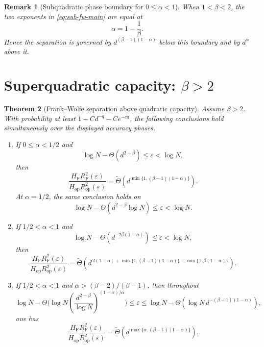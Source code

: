 \documentclass[11pt]{article}
\newtheorem{theorem}{Theorem}[section]
\newtheorem{remark}[theorem]{Remark}
\newcommand{\eps}{\varepsilon}
\newcommand{\RF}{R_{\mathrm F}}
\newcommand{\Rop}{R_{\mathrm{op}}}
\newcommand{\HF}{H_{\mathrm F}}
\newcommand{\Hop}{H_{\mathrm{op}}}
\begin{document}
\begin{remark}[Subquadratic phase boundary for $0\leq\alpha<1$]
When $1<\beta<2$, the two exponents in
\eqref{eq:sub-fw-main} are equal at
\[
 \alpha=1-\frac1\beta.
\]
Hence the separation is governed by
$d^{(\beta-1)(1-\alpha)}$ below this boundary and by $d^\alpha$ above
it.
\end{remark}

\section{Superquadratic capacity: \texorpdfstring{$\beta>2$}{beta>2}}

\begin{theorem}[Frank--Wolfe separation above quadratic capacity]
\label{thm:super-fw}
Assume $\beta>2$.  With probability at least
$1-Cd^{-q}-Ce^{-cd}$, the following conclusions hold simultaneously
over the displayed accuracy phases.

\begin{enumerate}[label=\textup{(\roman*)},leftmargin=2.2em]
\item If $0\leq\alpha<1/2$ and
\[
 \log N-\Theta(d^{2-\beta})\le\eps<\log N,
\]
then
\begin{equation}
 \frac{\HF\RF^2(\eps)}{\Hop\Rop^2(\eps)}
 =
 \widetilde\Theta\!\left(
 d^{\min\{1,(\beta-1)(1-\alpha)\}}
 \right).
 \label{eq:super-fw-diffuse-below}
\end{equation}
At $\alpha=1/2$, the same conclusion holds on
\[
 \log N-\Theta(d^{2-\beta}\log N)\leq\eps<\log N.
\]

\item If $1/2<\alpha<1$ and
\[
 \log N-\Theta(d^{-2\beta(1-\alpha)})\leq\eps<\log N,
\]
then
\begin{equation}
 \frac{\HF\RF^2(\eps)}{\Hop\Rop^2(\eps)}
 =
 \widetilde\Theta\!\left(
 d^{\,2(1-\alpha)
 +\min\{1,(\beta-1)(1-\alpha)\}
 -\min\{1,\beta(1-\alpha)\}}
 \right).
 \label{eq:super-fw-local-between}
\end{equation}

\item If $1/2<\alpha<1$ and
$\alpha>(\beta-2)/(\beta-1)$, then throughout
\begin{equation}
 \log N-\Theta\big(\log N
 \left(\frac{d^{2-\beta}}{\log N}\right)^{(1-\alpha)/\alpha}\big)
 \leq \eps
 \leq \log N-\Theta(\log N\,d^{-(\beta-1)(1-\alpha)}),
 \label{eq:super-fw-head-window}
\end{equation}
one has
\begin{equation}
 \frac{\HF\RF^2(\eps)}{\Hop\Rop^2(\eps)}
 =
 \widetilde\Theta\!\left(
 d^{\max\{\alpha,(\beta-1)(1-\alpha)\}}
 \right).
 \label{eq:super-fw-head-between}
\end{equation}


\end{enumerate}
\end{theorem}
\end{document}
